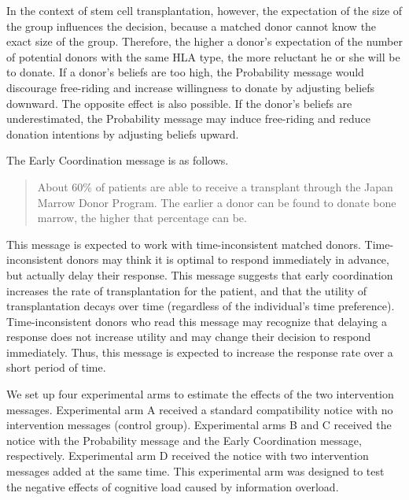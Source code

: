 \documentclass[
]{article}
\begin{document}
In the context of stem cell transplantation, however, the expectation of the size of the group influences the decision, because a matched donor cannot know the exact size of the group. Therefore, the higher a donor's expectation of the number of potential donors with the same HLA type, the more reluctant he or she will be to donate. If a donor's beliefs are too high, the Probability message would discourage free-riding and increase willingness to donate by adjusting beliefs downward. The opposite effect is also possible. If the donor's beliefs are underestimated, the Probability message may induce free-riding and reduce donation intentions by adjusting beliefs upward.

The Early Coordination message is as follows.

\begin{quote}
About 60\% of patients are able to receive a transplant through the Japan Marrow Donor Program. The earlier a donor can be found to donate bone marrow, the higher that percentage can be.
\end{quote}

This message is expected to work with time-inconsistent matched donors. Time-inconsistent donors may think it is optimal to respond immediately in advance, but actually delay their response. This message suggests that early coordination increases the rate of transplantation for the patient, and that the utility of transplantation decays over time (regardless of the individual's time preference). Time-inconsistent donors who read this message may recognize that delaying a response does not increase utility and may change their decision to respond immediately. Thus, this message is expected to increase the response rate over a short period of time.

We set up four experimental arms to estimate the effects of the two intervention messages. Experimental arm A received a standard compatibility notice with no intervention messages (control group). Experimental arms B and C received the notice with the Probability message and the Early Coordination message, respectively. Experimental arm D received the notice with two intervention messages added at the same time. This experimental arm was designed to test the negative effects of cognitive load caused by information overload.
\end{document}
